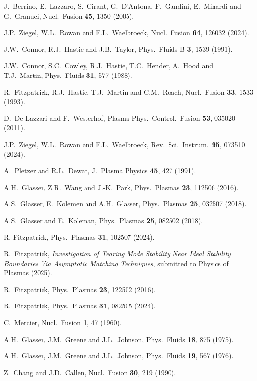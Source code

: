 \documentclass[12pt,prb,aps]{revtex4-1}
\begin{document}
\begin{thebibliography}{99}
 J.~Berrino, E.~Lazzaro, S.~Cirant, G.~D'Antona, F.~Gandini, E.~Minardi and G.~Granuci, Nucl.\ Fusion {\bf 45}, 1350 (2005).

 J.P.~Ziegel, W.L.~Rowan and F.L.~Waelbroeck, Nucl.\ Fusion {\bf 64}, 126032 (2024).

 J.W.~Connor, R.J.~Hastie and J.B.~Taylor, Phys.\ Fluids B {\bf 3}, 1539 (1991).

 J.W.~Connor,  S.C.~Cowley, R.J.~Hastie,  T.C.~Hender,  A.~Hood  and T.J.~Martin,  Phys.\ Fluids {\bf 31}, 577 (1988).

 R.~Fitzpatrick, R.J.~Hastie, T.J.~Martin and C.M.~Roach, Nucl.\ Fusion {\bf 33}, 1533 (1993).

 D.~De Lazzari and F.~Westerhof, Plasma Phys.\ Control.\ Fusion {\bf 53}, 035020 (2011).

 J.P.~Ziegel, W.L.~Rowan and F.L.~Waelbroeck, Rev.\ Sci.\ Instrum.\ {\bf 95}, 073510 (2024).

 A.~Pletzer and R.L.~Dewar, J.\ Plasma Physics {\bf 45}, 427 (1991).

 A.H.~Glasser, Z.R.~Wang and J.-K.~Park, Phys.\ Plasmas {\bf 23}, 112506 (2016).

 A.S.~Glasser, E.~Kolemen and A.H.~Glasser, Phys.\ Plasmas {\bf 25}, 032507 (2018).

 A.S.~Glasser and E.~Koleman, Phys.\ Plasmas {\bf 25}, 082502 (2018). 

 R. Fitzpatrick, Phys.\ Plasmas {\bf 31}, 102507 (2024).

 R.~Fitzpatrick,  {\em Investigation of  Tearing Mode Stability Near Ideal Stability Boundaries Via Asymptotic Matching Techniques}, submitted
to Physics of Plasmas (2025).

 R.~Fitzpatrick, Phys.\ Plasmas {\bf 23}, 122502 (2016).

 R.~Fitzpatrick, Phys.\ Plasmas {\bf 31}, 082505 (2024).

 C.~Mercier, Nucl.\ Fusion {\bf 1}, 47 (1960).

 A.H.~Glasser, J.M.~Greene and J.L.~Johnson, Phys.\ Fluids {\bf 18}, 875 (1975).

 A.H.~Glasser, J.M.~Greene  and J.L.~Johnson, Phys.\ Fluids {\bf 19}, 567 (1976).

 Z.~Chang and J.D.~Callen,  Nucl.\ Fusion {\bf 30}, 219 (1990).


\end{thebibliography}
\end{document}
